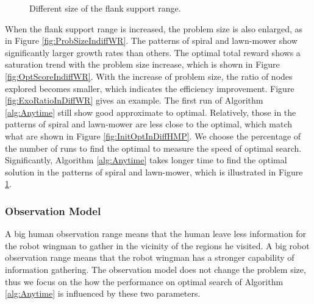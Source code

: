 \begin{figure}[H]
  \caption{Different size of the flank support range.} 
  \label{fig:PMdiffWR2} %
\end{figure}

When the flank support range is increased, the problem size is also enlarged, as in Figure \ref{fig:ProbSizeIndiffWR}.
The patterns of spiral and lawn-mower show significantly larger growth rates than others. 
The optimal total reward shows a saturation trend with the problem size increase, which is shown in Figure \ref{fig:OptScoreIndiffWR}.
With the increase of problem size, the ratio of nodes explored becomes smaller, which indicates the efficiency improvement.
Figure \ref{fig:ExoRatioInDiffWR} gives an example.
The first run of Algorithm \ref{alg:Anytime} still show good approximate to optimal. 
Relatively, those in the patterns of spiral and lawn-mower are less close to the optimal, which match what are shown in Figure \ref{fig:InitOptInDiffHMP}.
We choose the percentage of the number of runs to find the optimal to measure the speed of optimal search.
Significantly, Algorithm \ref{alg:Anytime} takes longer time to find the optimal solution in the patterns of spiral and lawn-mower, which is illustrated in Figure \ref{fig:PMdiffWR2}.

\subsubsection{Observation Model}
\label{subsubsec:observation_model}

A big human observation range means that the human leave less information for the robot wingman to gather in the vicinity of the regions he visited.
A big robot observation range means that the robot wingman has a stronger capability of information gathering.
The observation model does not change the problem size, thus we focus on the how the performance on optimal search of Algorithm \ref{alg:Anytime} is influenced by these two parameters.

